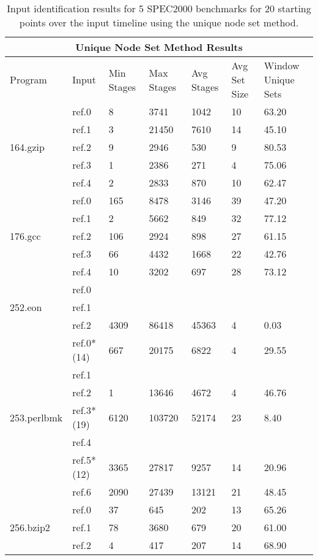 \begin{table}[h!]
\center
\begin{tabular}{|p{1.0in}|p{0.75in}|p{0.5in}|p{0.5in}|p{0.5in}|p{0.5in}|p{0.5in}|}
\hline
\multicolumn{7}{|c|}{Unique Node Set Method Results}\\
\hline
Program&Input&Min Stages&Max Stages&Avg Stages&Avg Set Size&Window Unique Sets\\
\hline\hline
\multirow{5}{*}{164.gzip}
    &ref.0&8&3741&1042&10&63.20\\
    &ref.1&3&21450&7610&14&45.10\\
    &ref.2&9&2946&530&9&80.53\\
    &ref.3&1&2386&271&4&75.06\\
    &ref.4&2&2833&870&10&62.47\\
\hline\hline
\multirow{5}{*}{176.gcc}
    &ref.0&165&8478&3146&39&47.20\\
    &ref.1&2&5662&849&32&77.12\\
    &ref.2&106&2924&898&27&61.15\\
    &ref.3&66&4432&1668&22&42.76\\
    &ref.4&10&3202&697&28&73.12\\
\hline\hline
\multirow{3}{*}{252.eon}
    &ref.0&&&&&\\
    &ref.1&&&&&\\
    &ref.2&4309&86418&45363&4&0.03\\
\hline\hline
\multirow{7}{*}{253.perlbmk}
    &ref.0*(14)&667&20175&6822&4&29.55\\
    &ref.1&&&&&\\
    &ref.2&1&13646&4672&4&46.76\\
    &ref.3*(19)&6120&103720&52174&23&8.40\\
    &ref.4&&&&&\\
    &ref.5*(12)&3365&27817&9257&14&20.96\\
    &ref.6&2090&27439&13121&21&48.45\\
\hline\hline
\multirow{3}{*}{256.bzip2}
    &ref.0&37&645&202&13&65.26\\
    &ref.1&78&3680&679&20&61.00\\
    &ref.2&4&417&207&14&68.90\\
\hline
\end{tabular}
\caption{Input identification results for 5 SPEC2000 benchmarks for 20 starting
points over the input timeline using the unique node set method.}
\label{table:input_id_nodeset_results}
\end{table}


